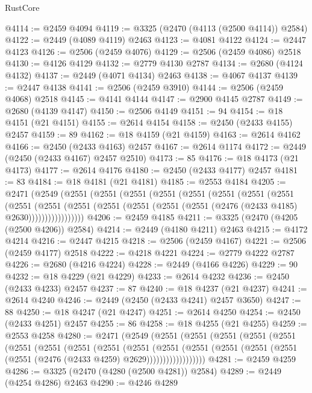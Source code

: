 \begin{lexlean}{RustCore}
\begin{coremodule}
@4114 := @2459 @4094
@4119 := @3325 (@2470 (@4113 (@2500 @4114)) @2584)
@4122 := @2449 (@4089 @4119) @2463
@4123 := @4081 @4122
@4124 := @2447 @4123
@4126 := @2506 (@2459 @4076)
@4129 := @2506 (@2459 @4086) @2518
@4130 := @4126 @4129
@4132 := @2779 @4130 @2787
@4134 := @2680 (@4124 @4132)
@4137 := @2449 (@4071 @4134) @2463
@4138 := @4067 @4137
@4139 := @2447 @4138
@4141 := @2506 (@2459 @3910)
@4144 := @2506 (@2459 @4068) @2518
@4145 := @4141 @4144
@4147 := @2900 @4145 @2787
@4149 := @2680 (@4139 @4147)
@4150 := @2506 @4149
@4151 := 94
@4154 := @18 @4151 (@21 @4151)
@4155 := @2614 @4154
@4158 := @2450 (@2433 @4155) @2457
@4159 := 89
@4162 := @18 @4159 (@21 @4159)
@4163 := @2614 @4162
@4166 := @2450 (@2433 @4163) @2457
@4167 := @2614 @1174
@4172 := @2449 (@2450 (@2433 @4167) @2457 @2510)
@4173 := 85
@4176 := @18 @4173 (@21 @4173)
@4177 := @2614 @4176
@4180 := @2450 (@2433 @4177) @2457
@4181 := 83
@4184 := @18 @4181 (@21 @4181)
@4185 := @2553 @4184
@4205 := @2471
    (@2549
      (@2551
        (@2551
          (@2551
            (@2551
              (@2551
                (@2551
                  (@2551
                    (@2551
                      (@2551
                        (@2551
                          (@2551
                            (@2551 (@2551 (@2551 (@2551 (@2476 (@2433 @4185) @2630)))))))))))))))))
@4206 := @2459 @4185
@4211 := @3325 (@2470 (@4205 (@2500 @4206)) @2584)
@4214 := @2449 (@4180 @4211) @2463
@4215 := @4172 @4214
@4216 := @2447 @4215
@4218 := @2506 (@2459 @4167)
@4221 := @2506 (@2459 @4177) @2518
@4222 := @4218 @4221
@4224 := @2779 @4222 @2787
@4226 := @2680 (@4216 @4224)
@4228 := @2449 (@4166 @4226)
@4229 := 90
@4232 := @18 @4229 (@21 @4229)
@4233 := @2614 @4232
@4236 := @2450 (@2433 @4233) @2457
@4237 := 87
@4240 := @18 @4237 (@21 @4237)
@4241 := @2614 @4240
@4246 := @2449 (@2450 (@2433 @4241) @2457 @3650)
@4247 := 88
@4250 := @18 @4247 (@21 @4247)
@4251 := @2614 @4250
@4254 := @2450 (@2433 @4251) @2457
@4255 := 86
@4258 := @18 @4255 (@21 @4255)
@4259 := @2553 @4258
@4280 := @2471
    (@2549
      (@2551
        (@2551
          (@2551
            (@2551
              (@2551
                (@2551
                  (@2551
                    (@2551
                      (@2551
                        (@2551
                          (@2551
                            (@2551
                              (@2551
                                (@2551 (@2551 (@2551 (@2476 (@2433 @4259) @2629))))))))))))))))))
@4281 := @2459 @4259
@4286 := @3325 (@2470 (@4280 (@2500 @4281)) @2584)
@4289 := @2449 (@4254 @4286) @2463
@4290 := @4246 @4289

\end{coremodule}
\end{lexlean}
